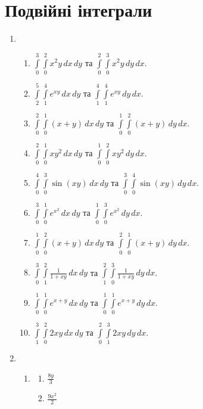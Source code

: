 \section{Подвійні інтеграли}
\begin{enumerate}
    \item
        \begin{enumerate}[label*=\arabic*.]
            \item $\int\limits_0^3\int\limits_0^2 x^2y\,dx\,dy$ та $\int\limits_0^2 \int\limits_0^3 x^2y\,dy\,dx$.
            \item $\int\limits_2^5\int\limits_1^4 e^{xy}\,dx\,dy$ та $\int\limits_1^4 \int\limits_1^4 e^{xy}\,dy\,dx$.
            \item $\int\limits_0^2\int\limits_0^1 (x+y)\,dx\,dy$ та $\int\limits_0^1 \int\limits_0^2 (x+y)\,dy\,dx$.
            \item $\int\limits_0^2\int\limits_0^1 xy^2\,dx\,dy$ та $\int\limits_0^1 \int\limits_0^2 xy^2\,dy\,dx$.
            \item $\int\limits_0^4\int\limits_0^3 \sin(xy)\,dx\,dy$ та $\int\limits_0^3 \int\limits_0^4 \sin(xy)\,dy\,dx$.
            \item $\int\limits_0^3\int\limits_0^1 e^{x^2}\,dx\,dy$ та $\int\limits_0^1 \int\limits_0^3 e^{x^2}\,dy\,dx$.
            \item $\int\limits_0^1\int\limits_0^2 (x+y)\,dx\,dy$ та $\int\limits_0^2 \int\limits_0^1 (x+y)\,dy\,dx$.
            \item $\int\limits_0^3\int\limits_1^2 \frac{1}{1+xy}\,dx\,dy$ та $\int\limits_1^2 \int\limits_0^3 \frac{1}{1+xy}\,dy\,dx$.
            \item $\int\limits_0^1\int\limits_0^1 e^{x+y}\,dx\,dy$ та $\int\limits_0^1 \int\limits_0^1 e^{x+y}\,dy\,dx$.
            \item $\int\limits_1^3\int\limits_0^2 2xy\,dx\,dy$ та $\int\limits_0^2 \int\limits_1^3 2xy\,dy\,dx$.
        \end{enumerate}
    \item
    \begin{enumerate}[label*=\arabic*.]
        \item \begin{multicols}{2}
                    \begin{enumerate}[label=(\alph*)]
                        \item ${\frac{8 y}{3}}$
                        \item ${\frac{9x^2}{2}}$
                    \end{enumerate}

\end{multicols}
\end{enumerate}
\end{enumerate}
